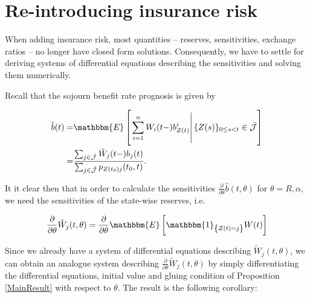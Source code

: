 \documentclass{book}
\newcommand{\1}[1]{\mathbbm{1}_{\left\lbrace #1 \right\rbrace}}
\newcommand{\expec}[1][def]{\mathbbm{E} \left[ #1 \right]}
\newcommand{\econd}[2][def]{\mathbbm{E} \left[ \left. #1 \right| #2 \right]}
\theoremstyle{break}
\theoremstyle{remark}
\numberwithin{equation}{section}
\begin{document}
\section{Re-introducing insurance risk}

When adding insurance risk, most quantities -- reserves, sensitivities, exchange ratios -- no longer have closed form solutions. Consequently, we have to settle for deriving systems of differential equations describing the sensitivities and solving them numerically.

Recall that the sojourn benefit rate prognosis is given by

\begin{align*}
	\hat{b}(t)=& \econd[\sum_{i=1}^n W_i(t-)b_{Z(t)}^i]{\{Z(s) \}_{0 \leq s < t} \in \bar{\mathcal{J}}} \\
	=& \frac{\sum_{j \in \hat{\mathcal{J}}} \tilde{W}_j(t-) b_j(t)}{\sum_{j \in \hat{\mathcal{J}}} p_{Z(t_0)j}(t_0,t)}.
\end{align*}

It it clear then that in order to calculate the sensitivities $\frac{\partial}{\partial \theta} \hat{b}(t,\theta)$ for $\theta=R,\alpha$, we need the sensitivities of the state-wise reserves, i.e.

\begin{align*}
	\frac{\partial}{\partial \theta} \tilde{W}_j(t,\theta) = \frac{\partial}{\partial \theta} \expec[\1{Z(t)=j} W(t)]
\end{align*}

Since we already have a system of differential equations describing $\tilde{W}_j(t,\theta)$, we can obtain an analogue system describing $\frac{\partial}{\partial \theta} \tilde{W}_j(t,\theta)$ by simply differentiating the differential equations, initial value and gluing condition of Proposition \ref{MainResult} with respect to $\theta$. The result is the following corollary:
\end{document}

